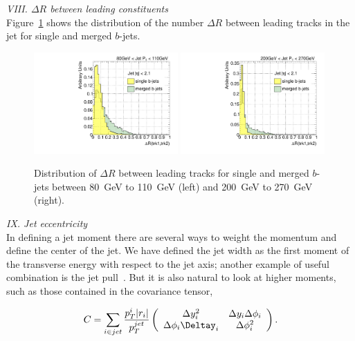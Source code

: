 { \em VIII. $\Delta R$ between leading constituents}
\\[3mm]

Figure~\ref{fig:drtrk12singlemerged} shows the distribution of the number  $\Delta R$ between leading tracks in the jet for single and merged $b$-jets.
\\[3mm]

\begin{figure}[tp]
\centering
\includegraphics[width=0.49\textwidth]{FIGS/VarsSingleMerged/DRtrk12080.pdf}
\includegraphics[width=0.49\textwidth]{FIGS/VarsSingleMerged/DRtrk12200.pdf}
\caption{Distribution of $\Delta R$ between leading tracks for single and merged $b$-jets between 80~GeV to 110~GeV (left) and 200~GeV to 270~GeV (right).}
\label{fig:drtrk12singlemerged}
\end{figure}


{ \em IX. Jet eccentricity}
\\[3mm]

In defining a jet moment there are several ways to weight the momentum and define the center of the jet. We have defined the jet width as the first moment of the transverse energy with respect to the jet axis; another example of useful combination is the jet pull~\cite{PhysRevLett.105.022001}. But it is also natural to look at higher moments, such as those contained in the covariance tensor,

\[ C = \sum_{i\in jet}\frac{p^i_T|r_i|}{p^{jet}_T} \left( \begin{array}{cc}
 \Delta y^2_i & \Delta y_i \Delta\phi_i \\ 
 \Delta\phi_i \Deltay_i & \Delta \phi^2_i \end{array} \right). \]


